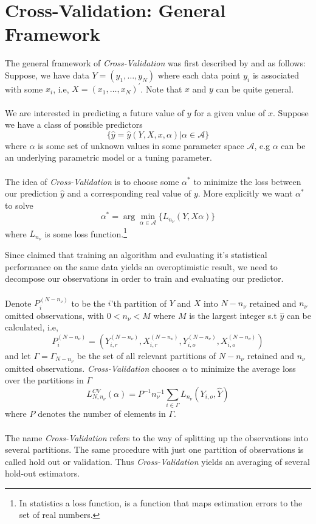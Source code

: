 \documentclass[Research_Module_ES.tex]{subfiles}
\begin{document}
\section{Cross-Validation: General Framework}
The general framework of \textit{Cross-Validation} was first described by \cite{stone1974cross} and  \cite{geisser1975predictive} as follows: \\

Suppose, we have data $Y=(y_1,\ldots,y_N)$ where each data point $y_i$ is associated with some $x_i$, i.e, $X=(x_1,\ldots,x_N)^\prime$. Note that $x$ and $y$ can be quite general.\\
\\
We are interested in predicting a future value of $y$ for a given value of $x$. Suppose we have a class of possible predictors 
\[
	\{\hat{y}=\hat{y}(Y,X,x,\alpha)|\alpha\in\mathscr{A}\}
\]
where $\alpha$ is some set of unknown values in some parameter space $\mathscr{A}$, e.g $\alpha$ can be an underlying parametric model or a tuning parameter.\\
\\
The idea of \textit{Cross-Validation} is to choose some $\alpha^\ast$ to minimize the loss between our prediction $\hat{y}$ and a corresponding real value of $y$. More explicitly we want $\alpha^\ast$ to solve
\[
	\alpha^\ast=\arg\min_{\alpha\in\mathscr{A}}\{L_{n_\nu}(Y,X\alpha)\}
\]
where $L_{n_\nu}$ is some loss function.\footnote{In statistics a loss function, is a function that maps estimation errors to the set of real numbers.  }
 
Since \cite{larson1931shrinkage} claimed that training an algorithm and evaluating it's statistical performance on the same data yields an overoptimistic result, we need to decompose our observations in order to train and evaluating our predictor. \\
\\
Denote $P^{(N-n_\nu)}_i$ to be the $i$'th partition of $Y$ and $X$ into $N-n_\nu$ retained and $n_\nu$ omitted observations, with $0<n_\nu<M$ where $M$ is the largest integer s.t $\hat{y}$ can be calculated, i.e,
\[
	P^{(N-n_\nu)}_i=(Y_{i,r}^{(N-n_\nu)},X_{i,r}^{(N-n_\nu)},Y_{i,o}^{(N-n_\nu)},X_{i,o}^{(N-n_\nu)})
\]
and let $\Gamma=\Gamma_{N-n_\nu}$ be the set of all relevant partitions of $N-n_\nu$ retained and $n_\nu$ omitted observations. \textit{Cross-Validation} chooses $\alpha$ to minimize the average loss over the partitions in $\Gamma$ 
\[
	L_{N,n_\nu}^{CV}(\alpha)=P^{-1}n_\nu^{-1}\sum_{i\in\Gamma}L_{n_\nu}(Y_{i,o},\hat{Y})
\]
where $P$ denotes the number of elements in $\Gamma$.\\
\\
The name \textit{Cross-Validation} refers to the way of splitting up the observations into several partitions. The same procedure with just one partition of observations is called hold out or validation. Thus \textit{Cross-Validation} yields an averaging of several hold-out estimators.
\end{document}
